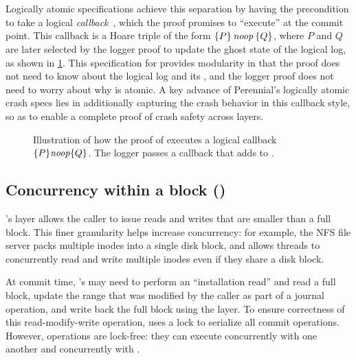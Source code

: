 Logically atomic specifications achieve this separation by having the precondition to 
take a logical \emph{callback}~\cite{jacobs:logatom}, which the proof promises to ``execute'' at the commit point.
This callback is a Hoare triple of the form $\hoare{P}{\SKIP}{Q}$, where $P$ and $Q$ are later selected
by the logger proof to update the  ghost state of the logical log, as shown in \cref{fig:circ-callback}.
This
specification for  provides modularity in that the  proof
does not need to know about the logical log and its , and the logger
proof does not need to worry about why  is atomic.  A key
advance of Perennial's logically atomic crash specs lies in additionally capturing the
crash behavior in this callback style, so as to enable a complete
proof of crash safety across layers.

\begin{figure}
  
  \caption{Illustration of how the proof of  executes a logical
callback $\{P\}\mathit{noop}\{Q\}$. The logger passes a callback that adds  to .}
  \label{fig:circ-callback}
\end{figure}

\subsection{Concurrency within a block ()}
\label{s:proof:obj}

\txn's  layer allows the caller to issue reads and writes that
are smaller than a full block.  This finer granularity helps increase
concurrency: for example, the NFS file server packs multiple inodes into
a single disk block, and  allows threads to concurrently read
and write multiple inodes even if they share a disk block.

At commit time, 's  may need to perform an
``installation read'' and read a full block, update the range that was
modified by the caller as part of a journal operation, and write back the
full block using the  layer.  To ensure correctness of this
read-modify-write operation,  uses a lock to serialize
all commit operations.  However,  operations are lock-free:
they can execute concurrently with one another and concurrently with
.

